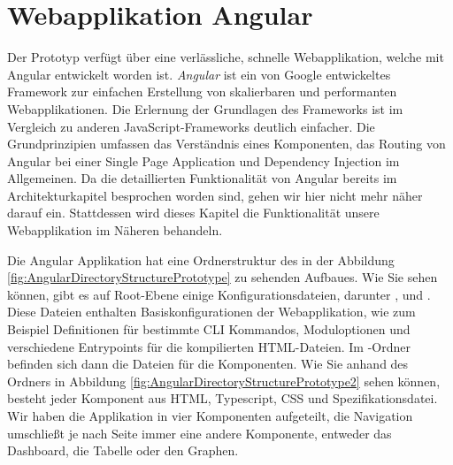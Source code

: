 \chapter{Webapplikation Angular}
\label{chp:frontend}

Der Prototyp verfügt über eine verlässliche, schnelle Webapplikation, welche mit Angular entwickelt worden ist. \emph{Angular} ist ein von Google entwickeltes Framework zur einfachen Erstellung von skalierbaren und performanten Webapplikationen. Die Erlernung der Grundlagen des Frameworks ist im Vergleich zu anderen JavaScript-Frameworks deutlich einfacher. Die Grundprinzipien umfassen das Verständnis eines Komponenten, das Routing von Angular bei einer Single Page Application und Dependency Injection im Allgemeinen. Da die detaillierten Funktionalität von Angular bereits im Architekturkapitel besprochen worden sind, gehen wir hier nicht mehr näher darauf ein. Stattdessen wird dieses Kapitel die Funktionalität unsere Webapplikation im Näheren behandeln. \cite{AngularFeatures,AngularComponents,AngularDI}

Die Angular Applikation hat eine Ordnerstruktur des in der Abbildung \ref{fig:AngularDirectoryStructurePrototype} zu sehenden Aufbaues. Wie Sie sehen können, gibt es auf Root-Ebene einige Konfigurationsdateien, darunter ,  und . Diese Dateien enthalten Basiskonfigurationen der Webapplikation, wie zum Beispiel Definitionen für bestimmte CLI Kommandos, Moduloptionen und verschiedene Entrypoints für die kompilierten HTML-Dateien. Im -Ordner befinden sich dann die Dateien für die Komponenten. Wie Sie anhand des Ordners  in Abbildung \ref{fig:AngularDirectoryStructurePrototype2} sehen können, besteht jeder Komponent aus HTML, Typescript, CSS und Spezifikationsdatei. Wir haben die Applikation in vier Komponenten aufgeteilt, die Navigation umschließt je nach Seite immer eine andere Komponente, entweder das Dashboard, die Tabelle oder den Graphen.


